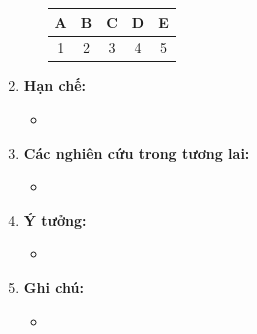 \documentclass[11pt]{article}
\begin{document}
\begin{enumerate}
\begin{itemize}
\begin{table}[h]
\begin{center}
            \begin{tabular}{|c|c|c|c|c|}
                \hline
                A & B & C & D & E \\
                \hline
                \hline
                1 & 2 & 3 & 4 & 5 \\
                \hline
        
            \end{tabular}
            \end{center}
        \end{table}
    \end{itemize}
    
    \item
    \textbf{Hạn chế:}
    \begin{itemize}
        \item \blindtext[0]
    \end{itemize}
    
    \item
    \textbf{Các nghiên cứu trong tương lai:}
    \begin{itemize}
        \item \blindtext[0]
    \end{itemize}
    
    \item
    \textbf{Ý tưởng:}
    \begin{itemize}
        \item \blindtext[0]
    \end{itemize}
    
    \item
    \textbf{Ghi chú:}
    \begin{itemize}
        \item \blindtext[0]
    \end{itemize}

         
\end{enumerate}
\end{document}

